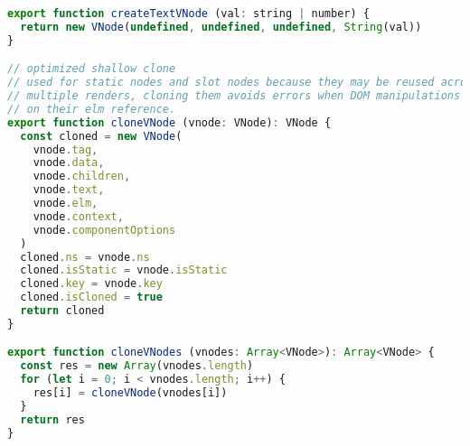 \begin{lstlisting}[language=JavaScript]
export function createTextVNode (val: string | number) {
  return new VNode(undefined, undefined, undefined, String(val))
}

// optimized shallow clone
// used for static nodes and slot nodes because they may be reused across
// multiple renders, cloning them avoids errors when DOM manipulations rely
// on their elm reference.
export function cloneVNode (vnode: VNode): VNode {
  const cloned = new VNode(
    vnode.tag,
    vnode.data,
    vnode.children,
    vnode.text,
    vnode.elm,
    vnode.context,
    vnode.componentOptions
  )
  cloned.ns = vnode.ns
  cloned.isStatic = vnode.isStatic
  cloned.key = vnode.key
  cloned.isCloned = true
  return cloned
}

export function cloneVNodes (vnodes: Array<VNode>): Array<VNode> {
  const res = new Array(vnodes.length)
  for (let i = 0; i < vnodes.length; i++) {
    res[i] = cloneVNode(vnodes[i])
  }
  return res
}
\end{lstlisting}




\begin{lstlisting}[language=JavaScript]

\end{lstlisting}




\begin{lstlisting}[language=JavaScript]

\end{lstlisting}




\begin{lstlisting}[language=JavaScript]

\end{lstlisting}




\begin{lstlisting}[language=JavaScript]

\end{lstlisting}




\begin{lstlisting}[language=JavaScript]

\end{lstlisting}

